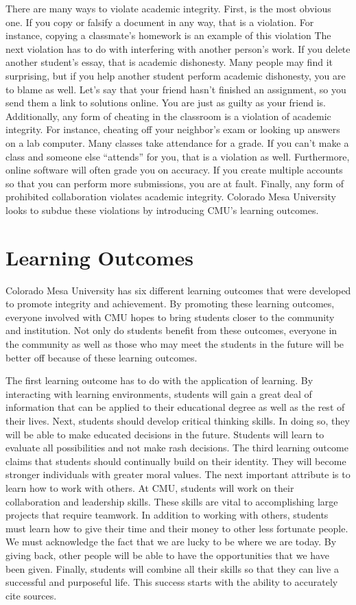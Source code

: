\documentclass[11pt]{article}
\begin{document}
There are many ways to violate academic integrity. First, is the most obvious one. If you copy or falsify a document in any way, that is a violation. For instance, copying a classmate's homework is an example of this violation The next violation has to do with interfering with another person’s work. If you delete another student’s essay, that is academic dishonesty. Many people may find it surprising, but if you help another student perform academic dishonesty, you are to blame as well. Let's say that your friend hasn’t finished an assignment, so you send them a link to solutions online. You are just as guilty as your friend is. Additionally, any form of cheating in the classroom is a violation of academic integrity. For instance, cheating off your neighbor's exam or looking up answers on a lab computer.  Many classes take attendance for a grade. If you can’t make a class and someone else “attends” for you, that is a violation as well. Furthermore, online software will often grade you on accuracy. If you create multiple accounts so that you can perform more submissions, you are at fault. Finally, any form of prohibited collaboration violates academic integrity. Colorado Mesa University looks to subdue these violations by introducing CMU's learning outcomes. 

\section{Learning Outcomes}
Colorado Mesa University has six different learning outcomes that were developed to promote integrity and achievement. By promoting these learning outcomes, everyone involved with CMU hopes to bring students closer to the community and institution. Not only do students benefit from these outcomes, everyone in the community as well as those who may meet the students in the future will be better off because of these learning outcomes.  

The first learning outcome has to do with the application of learning. By interacting with learning environments, students will gain a great deal of information that can be applied to their educational degree as well as the rest of their lives. Next, students should develop critical thinking skills. In doing so, they will be able to make educated decisions in the future. Students will learn to evaluate all possibilities and not make rash decisions. The third learning outcome claims that students should continually build on their identity. They will become stronger individuals with greater moral values. The next important attribute is to learn how to work with others. At CMU, students will work on their collaboration and leadership skills. These skills are vital to accomplishing large projects that require teamwork. In addition to working with others, students must learn how to give their time and their money to other less fortunate people. We must acknowledge the fact that we are lucky to be where we are today. By giving back, other people will be able to have the opportunities that we have been given. Finally, students will combine all their skills so that they can live a successful and purposeful life. This success starts with the ability to accurately cite sources. 
\end{document}
